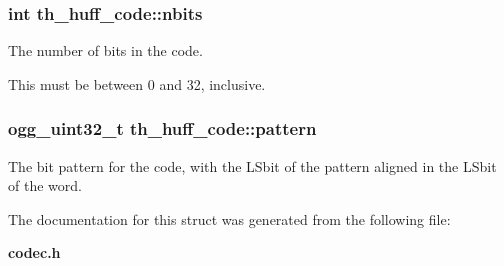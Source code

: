 \subsubsection[{nbits}]{\setlength{\rightskip}{0pt plus 5cm}int th\+\_\+huff\+\_\+code\+::nbits}\label{structth__huff__code_aaf97b8f2f90042f7bc136a7b2bc35e35}


The number of bits in the code. 

This must be between 0 and 32, inclusive. 
\subsubsection[{pattern}]{\setlength{\rightskip}{0pt plus 5cm}ogg\+\_\+uint32\+\_\+t th\+\_\+huff\+\_\+code\+::pattern}\label{structth__huff__code_a6dd29e3aa5a0c5a2dd5ce1f45b1162b4}


The bit pattern for the code, with the L\+Sbit of the pattern aligned in the L\+Sbit of the word. 



The documentation for this struct was generated from the following file\+:\begin{DoxyCompactItemize}
\item 
{\bf codec.\+h}\end{DoxyCompactItemize}
